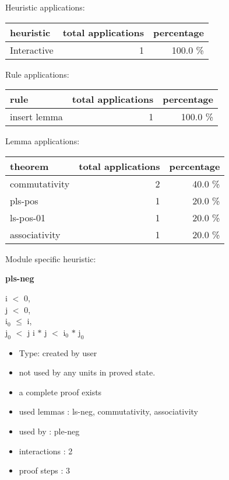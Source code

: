 \documentclass[a4paper]{article}
\begin{document}
\medskip


Heuristic applications:

\begin{supertabular}{l|r|r}
heuristic	& total applications & percentage \\ \hline
Interactive & 1 & 100.0 \% \\

\end{supertabular}

Rule applications:

\begin{supertabular}{l|r|r}
rule	        & total applications & percentage \\ \hline
insert lemma & 1 & 100.0 \% \\

\end{supertabular}

Lemma applications:

\begin{supertabular}{l|r|r}
theorem	        & total applications & percentage \\ \hline
commutativity & 2 & 40.0 \% \\
pls-pos & 1 & 20.0 \% \\
ls-pos-01 & 1 & 20.0 \% \\
associativity & 1 & 20.0 \% \\

\end{supertabular}

Module specific heuristic:

\pagebreak

{\LARGE\bf pls-neg}\label{lemma-pls-neg}

\medskip

i $<$ 0, \\
j $<$ 0, \\
$\mbox{i}_{0}$ $\le$ i, \\
$\mbox{j}_{0}$ $<$ j \Fol i $*$ j $<$ $\mbox{i}_{0}$ $*$ $\mbox{j}_{0}$

\begin{itemize}

\item Type: created by user

\item not used by any units in proved state.
\item       a complete proof exists
\item       used lemmas  : ls-neg, commutativity, associativity
\item       used by      : ple-neg
\item       interactions : 2
\item       proof steps  : 3
\end{itemize}
\end{document}
